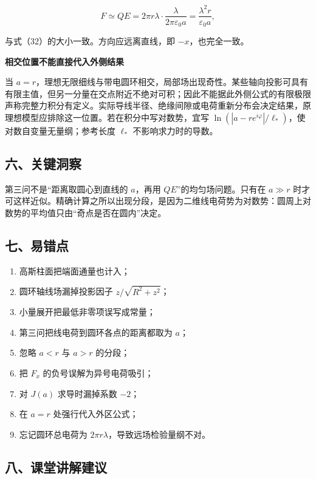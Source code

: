 \documentclass[12pt,a4paper,UTF8]{ctexart}
\newcommand{\tightlist}{\setlength{\itemsep}{0pt}\setlength{\parskip}{0pt}}
\begin{document}
\[
F\simeq QE
=2\pi r\lambda\cdot
\frac{\lambda}{2\pi\varepsilon_0a}
=\frac{\lambda^2r}{\varepsilon_0a},
\]

与式（32）的大小一致。方向应远离直线，即 \(-x\)，也完全一致。

\textbf{相交位置不能直接代入外侧结果}

当
\(a=r\)，理想无限细线与带电圆环相交，局部场出现奇性。某些轴向投影可具有有限主值，但另一分量在交点附近不绝对可积；因此不能据此外侧公式的有限极限声称完整力积分有定义。实际导线半径、绝缘间隙或电荷重新分布会决定结果，原理想模型应排除这一位置。若在积分中写对数势，宜写
\(\ln(|a-re^{i\varphi}|/\ell_*)\)，使对数自变量无量纲；参考长度
\(\ell_*\) 不影响求力时的导数。

\subsection{六、关键洞察}\label{ux516dux5173ux952eux6d1eux5bdf-4}

第三问不是``距离取圆心到直线的 \(a\)，再用 \(QE\)''的均匀场问题。只有在
\(a\gg r\)
时才可这样近似。精确计算之所以出现分段，是因为二维线电荷势为对数势：圆周上对数势的平均值只由``奇点是否在圆内''决定。

\subsection{七、易错点}\label{ux4e03ux6613ux9519ux70b9-4}

\begin{enumerate}
\def\labelenumi{\arabic{enumi}.}
\tightlist
\item
  高斯柱面把端面通量也计入；
\item
  圆环轴线场漏掉投影因子 \(z/\sqrt{R^2+z^2}\)；
\item
  小量展开把最低非零项误写成常量；
\item
  第三问把线电荷到圆环各点的距离都取为 \(a\)；
\item
  忽略 \(a<r\) 与 \(a>r\) 的分段；
\item
  把 \(F_x\) 的负号误解为异号电荷吸引；
\item
  对 \(J(a)\) 求导时漏掉系数 \(-2\)；
\item
  在 \(a=r\) 处强行代入外区公式；
\item
  忘记圆环总电荷为 \(2\pi r\lambda\)，导致远场检验量纲不对。
\end{enumerate}

\subsection{八、课堂讲解建议}\label{ux516bux8bfeux5802ux8bb2ux89e3ux5efaux8bae-4}
\end{document}
